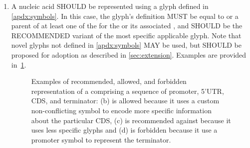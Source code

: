 \begin{enumerate}
\item A nucleic acid  SHOULD be represented using a glyph defined in \ref{apdx:symbols}.  In this case, the glyph's definition MUST be equal to or a parent of at least one of the  for the  or its associated , and SHOULD be the RECOMMENDED variant of the most specific applicable glyph.  Note that novel glyphs not defined in \ref{apdx:symbols} MAY be used, but SHOULD be proposed for adoption as described in \ref{sec:extension}.
	Examples are provided in~\ref{exa:2f}.
	\begin{figure}[h!]
	\centering
	\caption{Examples of recommended, allowed, and forbidden representation of a  comprising a sequence of promoter, 5'UTR, CDS, and terminator: (b) is allowed because it uses a custom non-conflicting symbol to encode more specific information about the particular CDS, (c) is recommended against because it uses less specific glyphs and (d) is forbidden because it use a promoter symbol to represent the terminator.}
	\label{exa:2f}
	\end{figure}
\end{enumerate}
	
